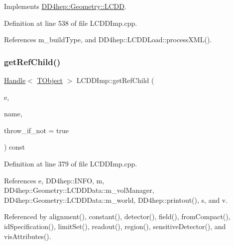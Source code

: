 Implements \hyperlink{class_d_d4hep_1_1_geometry_1_1_l_c_d_d_aab90efbd334c08ee8a06b0f97d219243}{D\+D4hep\+::\+Geometry\+::\+L\+C\+DD}.



Definition at line 538 of file L\+C\+D\+D\+Imp.\+cpp.



References m\+\_\+build\+Type, and D\+D4hep\+::\+L\+C\+D\+D\+Load\+::process\+X\+M\+L().

\hypertarget{class_d_d4hep_1_1_geometry_1_1_l_c_d_d_imp_a209313e0d04b1c67385f90ca75483fd9}{}\label{class_d_d4hep_1_1_geometry_1_1_l_c_d_d_imp_a209313e0d04b1c67385f90ca75483fd9} 
\subsubsection{\texorpdfstring{get\+Ref\+Child()}{getRefChild()}}
{\footnotesize\ttfamily \hyperlink{class_d_d4hep_1_1_handle}{Handle}$<$ \hyperlink{class_t_object}{T\+Object} $>$ L\+C\+D\+D\+Imp\+::get\+Ref\+Child (\begin{DoxyParamCaption}\item[{const \hyperlink{class_d_d4hep_1_1_geometry_1_1_l_c_d_d_a05cb11e7355772c7b0794bcca59bf477}{Handle\+Map} \&}]{e,  }\item[{const std\+::string \&}]{name,  }\item[{bool}]{throw\+\_\+if\+\_\+not = {\ttfamily true} }\end{DoxyParamCaption}) const\hspace{0.3cm}{\ttfamily [virtual]}}



Definition at line 379 of file L\+C\+D\+D\+Imp.\+cpp.



References e, D\+D4hep\+::\+I\+N\+FO, m, D\+D4hep\+::\+Geometry\+::\+L\+C\+D\+D\+Data\+::m\+\_\+vol\+Manager, D\+D4hep\+::\+Geometry\+::\+L\+C\+D\+D\+Data\+::m\+\_\+world, D\+D4hep\+::printout(), s, and v.



Referenced by alignment(), constant(), detector(), field(), from\+Compact(), id\+Specification(), limit\+Set(), readout(), region(), sensitive\+Detector(), and vis\+Attributes().

\hypertarget{class_d_d4hep_1_1_geometry_1_1_l_c_d_d_imp_a56791e681806ce40fa0e9214a57f41f5}{}\label{class_d_d4hep_1_1_geometry_1_1_l_c_d_d_imp_a56791e681806ce40fa0e9214a57f41f5} 
